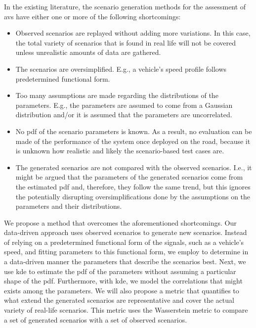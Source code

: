In the existing literature, the scenario generation methods for the assessment of \acp{av} have either one or more of the following shortcomings:
\begin{itemize}
	\item Observed scenarios are replayed without adding more variations. 
	In this case, the total variety of scenarios that is found in real life will not be covered unless unrealistic amounts of data are gathered.
	
	\item The scenarios are oversimplified.
	E.g., a vehicle's speed profile follows predetermined functional form.
	
	\item Too many assumptions are made regarding the distributions of the parameters.
	E.g., the parameters are assumed to come from a Gaussian distribution and/or it is assumed that the parameters are uncorrelated.
	
	\item No \ac{pdf} of the scenario parameters is known. 
	As a result, no evaluation can be made of the performance of the system once deployed on the road, because it is unknown how realistic and likely the scenario-based test cases are.
	
	\item The generated scenarios are not compared with the observed scenarios. 
	I.e., it might be argued that the parameters of the generated scenarios come from the estimated \ac{pdf} and, therefore, they follow the same trend, but this ignores the potentially disrupting oversimplifications done by the assumptions on the parameters and their distributions.
\end{itemize}

We propose a method that overcomes the aforementioned shortcomings.
Our data-driven approach uses observed scenarios to generate new scenarios.
Instead of relying on a predetermined functional form of the signals, such as a vehicle's speed, and fitting parameters to this functional form, we employ  \autocite{golub2013matrix} to determine in a data-driven manner the parameters that describe the scenarios best.
Next, we use \ac{kde} \autocite{rosenblatt1956remarks, parzen1962estimation} to estimate the \ac{pdf} of the parameters without assuming a particular shape of the \ac{pdf}. 
Furthermore, with \ac{kde}, we model the correlations that might exists among the parameters.
We will also propose a metric that quantifies to what extend the generated scenarios are representative and cover the actual variety of real-life scenarios. 
This metric uses the Wasserstein metric \autocite{ruschendorf1985wasserstein} to compare a set of generated scenarios with a set of observed scenarios.

